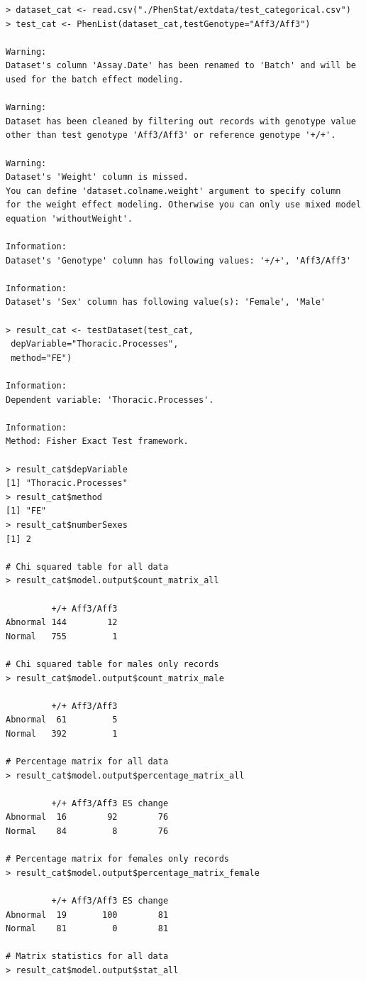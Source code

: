\documentclass[12pt,a4paper]{article}
\begin{document}
\begingroup
    \fontsize{8pt}{12pt}\selectfont
\begin{verbatim}
> dataset_cat <- read.csv("./PhenStat/extdata/test_categorical.csv")
> test_cat <- PhenList(dataset_cat,testGenotype="Aff3/Aff3")
 
Warning:
Dataset's column 'Assay.Date' has been renamed to 'Batch' and will be used for the batch effect modeling.

Warning:
Dataset has been cleaned by filtering out records with genotype value 
other than test genotype 'Aff3/Aff3' or reference genotype '+/+'.

Warning:
Dataset's 'Weight' column is missed.
You can define 'dataset.colname.weight' argument to specify column 
for the weight effect modeling. Otherwise you can only use mixed model equation 'withoutWeight'.

Information:
Dataset's 'Genotype' column has following values: '+/+', 'Aff3/Aff3'

Information:
Dataset's 'Sex' column has following value(s): 'Female', 'Male'

> result_cat <- testDataset(test_cat,
 depVariable="Thoracic.Processes",
 method="FE")

Information:
Dependent variable: 'Thoracic.Processes'.

Information:
Method: Fisher Exact Test framework.

> result_cat$depVariable
[1] "Thoracic.Processes"
> result_cat$method
[1] "FE"
> result_cat$numberSexes
[1] 2

# Chi squared table for all data
> result_cat$model.output$count_matrix_all

         +/+ Aff3/Aff3
Abnormal 144        12
Normal   755         1

# Chi squared table for males only records
> result_cat$model.output$count_matrix_male

         +/+ Aff3/Aff3
Abnormal  61         5
Normal   392         1

# Percentage matrix for all data
> result_cat$model.output$percentage_matrix_all

         +/+ Aff3/Aff3 ES change
Abnormal  16        92        76
Normal    84         8        76

# Percentage matrix for females only records
> result_cat$model.output$percentage_matrix_female

         +/+ Aff3/Aff3 ES change
Abnormal  19       100        81
Normal    81         0        81

# Matrix statistics for all data
> result_cat$model.output$stat_all


\end{verbatim}
\end{document}
